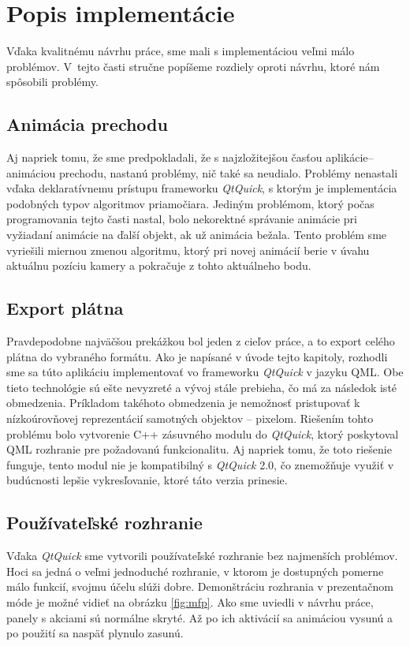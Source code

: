 \section{Popis implementácie}

Vďaka kvalitnému návrhu práce, sme mali s implementáciou veľmi málo problémov. V~tejto časti stručne popíšeme rozdiely oproti návrhu, ktoré nám spôsobili problémy.

\subsection{Animácia prechodu}

Aj napriek tomu, že sme predpokladali, že s najzložitejšou časťou aplikácie-- animáciou prechodu, nastanú problémy, nič také sa neudialo. Problémy nenastali vďaka deklaratívnemu prístupu frameworku \textit{QtQuick}, s ktorým je implementácia podobných typov algoritmov priamočiara. Jediným problémom, ktorý počas programovania tejto časti nastal, bolo nekorektné správanie animácie pri vyžiadaní animácie na ďalší objekt, ak už animácia bežala. Tento problém sme vyriešili miernou zmenou algoritmu, ktorý pri novej animácií berie v úvahu aktuálnu pozíciu kamery a pokračuje z tohto aktuálneho bodu.

\subsection{Export plátna}

Pravdepodobne najväčšou prekážkou bol jeden z cieľov práce, a to export celého plátna do vybraného formátu. Ako je napísané v úvode tejto kapitoly, rozhodli sme sa túto aplikáciu implementovať vo frameworku \textit{QtQuick} v jazyku QML. Obe tieto technológie sú ešte nevyzreté a vývoj stále prebieha, čo má za následok isté obmedzenia. Príkladom takéhoto obmedzenia je nemožnosť pristupovať k nízkoúrovňovej reprezentácií samotných objektov -- pixelom. Riešením tohto problému bolo vytvorenie C++ zásuvného modulu do \textit{QtQuick}, ktorý poskytoval QML rozhranie pre požadovanú funkcionalitu. Aj napriek tomu, že toto riešenie funguje, tento modul nie je kompatibilný s \textit{QtQuick} 2.0, čo znemožňuje využiť v budúcnosti lepšie vykresľovanie, ktoré táto verzia prinesie.

\subsection{Používateľské rozhranie}

Vďaka \textit{QtQuick} sme vytvorili používateľské rozhranie bez najmenších problémov. Hoci sa jedná o veľmi jednoduché rozhranie, v ktorom je dostupných pomerne málo funkcií, svojmu účelu slúži dobre. Demonštráciu rozhrania v prezentačnom móde je možné vidieť na obrázku \ref{fig:mfp}. Ako sme uviedli v návrhu práce, panely s akciami sú normálne skryté. Až po ich aktivácií sa animáciou vysunú a po použití sa naspäť plynulo zasunú.

